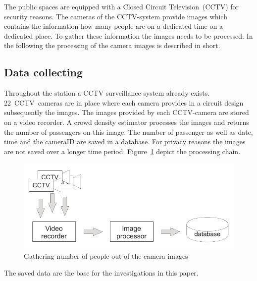 The public spaces are equipped with a Closed Circuit Television~(CCTV) for security reasons. The cameras of the CCTV-system provide images which contains the information how many people are on a dedicated time on a dedicated place. To gather these information the images needs to be processed. In the following the processing of the camera images is described in short.


\subsection{Data collecting}
\label{subsec:data}

Throughout the station a CCTV surveillance system already exists. 22~CCTV~cameras are in place where each camera provides in a circuit design subsequently the images. The images provided by each CCTV-camera are stored on a video recorder. A crowd density estimator processes the images and returns the number of passengers on this image. The number of passenger as well as date, time and the cameraID are saved in a database. For privacy reasons the images are not saved over a longer time period. Figure~\ref{fig:imageProcessing} depict the processing chain.

\begin{figure}[htb]
  \centering
  \includegraphics[width=\linewidth]{imageProcessing.pdf} 
  \caption{Gathering number of people out of the camera images}
  \label{fig:imageProcessing}
\end{figure}

The saved data are the base for the investigations in this paper.